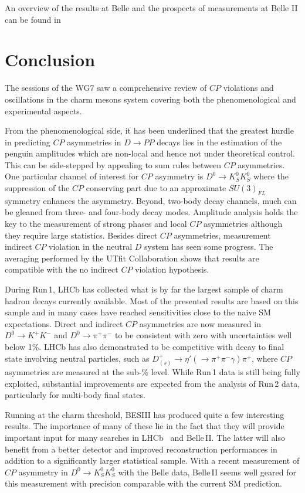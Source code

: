 \documentclass{PoS}
\newcommand{\CP}{{\ensuremath{C\!P}}\xspace}
\begin{document}
An overview of the results at Belle and the prospects of measurements at Belle II can be found in~\cite{Bahinipati:2017hsw,Bhardwaj:2017hsw}

\section{Conclusion}
\label{sec:conclusion}
The sessions of the WG7 saw a comprehensive review of \CP violations and oscillations in the charm mesons system covering both the phenomenological and experimental aspects.

From the phenomenological side, it has been underlined that the greatest hurdle in predicting \CP asymmetries in $D\to P P$ decays lies in the estimation of the penguin amplitudes which are non-local and hence not under theoretical control. This can be side-stepped by appealing to sum rules between \CP asymmetries. One particular channel of interest for \CP asymmetry is $D^0\to K^0_SK^0_S$ where the suppression of the \CP conserving part due to an approximate $SU(3)_{FL}$ symmetry enhances the asymmetry. Beyond, two-body decay channels, much can be gleaned from three- and four-body decay modes. Amplitude analysis holds the key to the measurement of strong phases and local \CP asymmetries although they require large statistics. Besides direct \CP asymmetries, measurement indirect \CP violation in the neutral $D$ system has seen some progress. The averaging performed by the UTfit Collaboration shows that results are compatible with the no indirect \CP violation hypothesis.

During Run\,1, LHCb has collected what is by far the largest sample of charm hadron decays currently available. Most of the presented results are based on this sample and in many cases have reached sensitivities close to the naive SM expectations. Direct and indirect \CP asymmetries are now measured in $D^0\to K^+K^-$ and $D^0\to\pi^+\pi^-$ to be consistent with zero with uncertainties well below 1\%. LHCb has also demonstrated to be competitive with decay to final state involving neutral particles, such as $D^+_{(s)}\to \eta'(\to\pi^+\pi^-\gamma)\pi^+$, where \CP asymmetries are measured at the sub-\% level. While Run\,1 data is still being fully exploited, substantial improvements are expected from the analysis of Run\,2 data, particularly for multi-body final states.

Running at the charm threshold, BESIII has produced quite a few interesting results. The importance of many of these lie in the fact that they will provide important input for many searches in LHCb~\cite{Malde:2223391} and Belle\,II. The latter will also benefit from a better detector and improved reconstruction performances in addition to a significantly larger statistical sample. With a recent measurement of \CP asymmetry in $D^0\to K^0_SK^0_S$ with the Belle data, Belle\,II seems well geared for this measurement with precision comparable with the current SM prediction.
\end{document}
